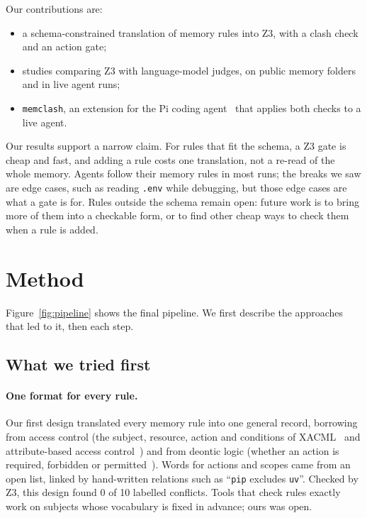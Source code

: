 \documentclass[11pt]{article}
\begin{document}
Our contributions are:
\begin{itemize}
  \item a schema-constrained translation of memory rules into Z3, with a clash check and an action gate;
  \item studies comparing Z3 with language-model judges, on public memory folders and in live agent runs;
  \item \texttt{memclash}, an extension for the Pi coding agent~\cite{pi} that applies both checks to a live agent.
\end{itemize}

Our results support a narrow claim. For rules that fit the schema, a Z3 gate is cheap and fast,
and adding a rule costs one translation, not a re-read of the whole memory. Agents follow their
memory rules in most runs; the breaks we saw are edge cases, such as reading \texttt{.env} while
debugging, but those edge cases are what a gate is for. Rules outside the schema remain open:
future work is to bring more of them into a checkable form, or to find other cheap ways to check
them when a rule is added.

\section{Method}

Figure~\ref{fig:pipeline} shows the final pipeline. We first describe the approaches that led to
it, then each step.

\subsection{What we tried first}

\paragraph{One format for every rule.} Our first design translated every memory rule into one
general record, borrowing from access control (the subject, resource, action and conditions of
XACML~\cite{xacml} and attribute-based access control~\cite{abac}) and from deontic logic (whether an
action is required, forbidden or permitted~\cite{vonwright}). Words for actions and scopes came
from an open list, linked by hand-written relations such as ``\texttt{pip} excludes \texttt{uv}''.
Checked by Z3, this design found 0 of 10 labelled conflicts. Tools that check rules exactly work on
subjects whose vocabulary is fixed in advance; ours was open.
\end{document}
